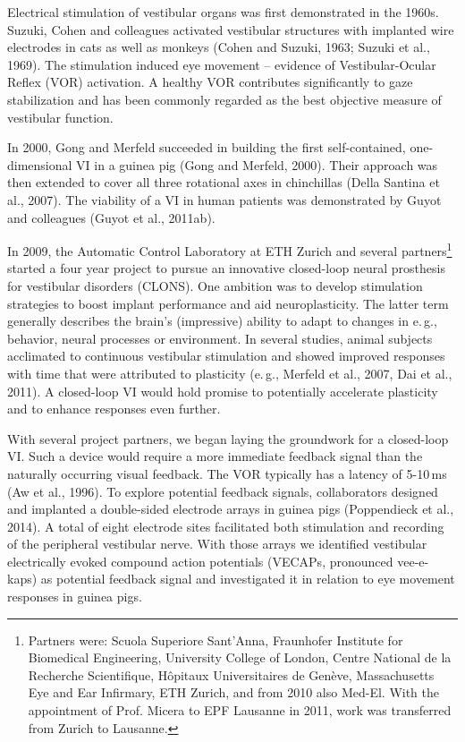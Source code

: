 Electrical stimulation of vestibular organs was first demonstrated in the 1960s. Suzuki, Cohen and colleagues activated vestibular structures with implanted wire electrodes in cats as well as monkeys (Cohen and Suzuki, 1963; Suzuki et al., 1969). The stimulation induced eye movement -- evidence of Vestibular-Ocular Reflex (VOR) activation. A healthy VOR contributes significantly to gaze stabilization and has been commonly regarded as the best objective measure of vestibular function.

In 2000, Gong and Merfeld succeeded in building the first self-contained, one-dimensional VI in a guinea pig (Gong and Merfeld, 2000). Their approach was then extended to cover all three rotational axes in chinchillas (Della Santina et al., 2007). The viability of a VI in human patients was demonstrated by Guyot and colleagues (Guyot et al., 2011ab). 

In 2009, the Automatic Control Laboratory at ETH Zurich and several  partners\footnote{Partners were: Scuola Superiore Sant'Anna, Fraunhofer Institute for Biomedical Engineering, University College of London, Centre National de la Recherche Scientifique, Hôpitaux Universitaires de Genève, Massachusetts Eye and Ear Infirmary, ETH Zurich, and from 2010 also Med-El. With the appointment of Prof. Micera to EPF Lausanne in 2011, work was transferred from Zurich to Lausanne.} started a four year project to pursue an innovative closed-loop neural prosthesis for vestibular disorders (CLONS). One ambition was to develop stimulation strategies to boost implant performance and aid neuroplasticity. The latter term generally describes the brain's (impressive) ability to adapt to changes in e.\,g., behavior, neural processes or environment. In several studies, animal subjects acclimated to continuous vestibular stimulation and showed improved responses with time that were attributed to plasticity (e.\,g., Merfeld et al., 2007, Dai et al., 2011). A closed-loop VI would hold promise to potentially accelerate plasticity and to enhance responses even further.

With several project partners, we began laying the groundwork for a closed-loop VI. Such a device would require a more immediate feedback signal than the naturally occurring visual feedback. The VOR typically has a latency of 5-10\,ms (Aw et al., 1996). To explore potential feedback signals, collaborators designed and implanted a double-sided electrode arrays in guinea pigs (Poppendieck et al., 2014). A total of eight electrode sites facilitated both stimulation and recording of the peripheral vestibular nerve. With those arrays  we identified vestibular electrically evoked compound action potentials (VECAPs, pronounced vee-e-kaps) as potential feedback signal and investigated it in relation to eye movement responses in guinea pigs. 

